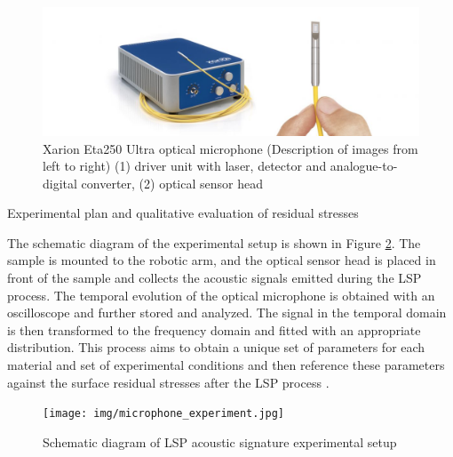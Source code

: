 \begin{figure}[h]
    \centering
    \includegraphics[width=0.9\linewidth]{img/xarion_box.jpg}
    \caption{Xarion Eta250 Ultra optical microphone (Description of images from left to right) (1) driver unit with laser, detector and analogue-to-digital converter, (2) optical sensor head \cite{xarion_eta}}
    \label{fig:xarion_box}
\end{figure}

\smallskip
Experimental plan and qualitative evaluation of residual stresses

The schematic diagram of the experimental setup is shown in Figure  \ref{fig:experiment_microphone}. The sample is mounted to the robotic arm, and the optical sensor head is placed in front of the sample and collects the acoustic signals emitted during the LSP process. The temporal evolution of the optical microphone is obtained with an oscilloscope and further stored and analyzed. The signal in the temporal domain is then transformed to the frequency domain and fitted with an appropriate distribution. This process aims to obtain a unique set of parameters for each material and set of experimental conditions and then reference these parameters against the surface residual stresses after the LSP process \cite{banerjee_2019}. 

\begin{figure}[h]
    \centering
    \texttt{[image: img/microphone\_experiment.jpg]}
    \caption{Schematic diagram of LSP acoustic signature experimental setup \cite{wu_zhao_qiao_liu_zhang_hu_2018}}
    \label{fig:experiment_microphone}
\end{figure}






